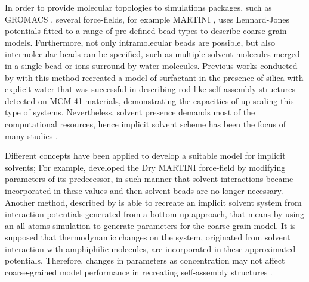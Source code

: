 \documentclass[10pt,a4paper,twoside]{article}
\begin{document}
In order to provide molecular topologies to simulations packages, such as  GROMACS \cite{gromanual}, several force-fields, for example MARTINI \cite{martini}, uses Lennard-Jones potentials fitted to a range of pre-defined bead types to describe coarse-grain models. Furthermore, not only intramolecular beads are possible, but also intermolecular beads can be specified, such as multiple solvent molecules merged in a single bead or ions surround by water molecules. Previous works conducted by \cite{mjsilica} with this method recreated a model of surfactant in the presence of silica with explicit water that was successful in describing rod-like self-assembly structures detected on MCM-41 materials, demonstrating the capacities of up-scaling this type of systems. Nevertheless, solvent presence demands most of the computational resources, hence  implicit solvent scheme has been the focus of many studies \cite{gromacs}.

Different concepts have been applied to develop a suitable model for implicit solvents; For example,  developed the Dry MARTINI force-field by modifying parameters of its predecessor, in such manner that solvent interactions became incorporated in these values and then solvent beads are no longer necessary. Another method, described by  is able to recreate an implicit solvent system from interaction potentials generated from a bottom-up approach, that means by using an all-atoms simulation to generate parameters for the coarse-grain model. It is supposed  that thermodynamic changes on the system, originated from solvent interaction with amphiphilic molecules, are incorporated in these approximated potentials. Therefore, changes in parameters as concentration may not affect coarse-grained model performance in recreating self-assembly structures \cite{dmpc}.
\end{document}
